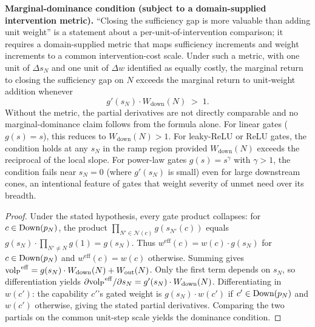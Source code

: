 \begin{proposition}
\medskip\noindent
\textbf{Marginal-dominance condition (subject to a
domain-supplied intervention metric).}
``Closing the sufficiency gap is more valuable than adding
unit weight'' is a statement about a per-unit-of-intervention
comparison; it requires a domain-supplied metric that maps
sufficiency increments and weight increments to a common
intervention-cost scale.  Under such a metric, with one unit
of $\Delta s_N$ and one unit of $\Delta w$ identified as
equally costly, the marginal return to closing the sufficiency
gap on $N$ exceeds the marginal return to unit-weight addition
whenever
\[
  g'(s_N) \cdot W_{\mathrm{down}}(N) \;>\; 1.
\]
Without the metric, the partial derivatives are not
directly comparable and no marginal-dominance claim follows
from the formula alone.
For linear gates ($g(s) = s$), this reduces to
$W_{\mathrm{down}}(N) > 1$.  For leaky-ReLU or ReLU gates, the
condition holds at any $s_N$ in the ramp region provided
$W_{\mathrm{down}}(N)$ exceeds the reciprocal of the local
slope.  For power-law gates $g(s) = s^\gamma$ with $\gamma > 1$,
the condition fails near $s_N = 0$ (where $g'(s_N)$ is small)
even for large downstream cones, an intentional feature of
gates that weight severity of unmet need over its breadth.
\end{proposition}

\begin{proof}
Under the stated hypothesis, every gate product collapses: for
$c \in \mathrm{Down}(p_N)$, the product $\prod_{N' \in \mathcal{N}(c)}
g(s_{N'}(c))$ equals $g(s_N) \cdot \prod_{N' \neq N} g(1) =
g(s_N)$.  Thus
$w^{\mathrm{eff}}(c) = w(c) \cdot g(s_N)$ for
$c \in \mathrm{Down}(p_N)$ and $w^{\mathrm{eff}}(c) = w(c)$ otherwise.
Summing gives
${\operatorname{vol}_{\mathrm{P}}}^{\mathrm{eff}} = g(s_N) \cdot W_{\mathrm{down}}(N) +
W_{\mathrm{out}}(N)$.
Only the first term depends on $s_N$, so differentiation yields
$\partial {\operatorname{vol}_{\mathrm{P}}}^{\mathrm{eff}}/\partial s_N =
g'(s_N) \cdot W_{\mathrm{down}}(N)$.  Differentiating in
$w(c')$: the capability $c'$'s gated weight is $g(s_N) \cdot
w(c')$ if $c' \in \mathrm{Down}(p_N)$ and $w(c')$ otherwise, giving the
stated partial derivatives.  Comparing the two partials on the
common unit-step scale yields the dominance condition.
\end{proof}

